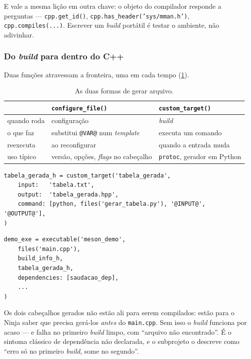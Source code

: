 E vale a mesma lição em outra chave: o objeto do compilador responde a
perguntas --- \texttt{cpp.get\_id()}, \texttt{cpp.has\_header('sys/mman.h')},
\texttt{cpp.compiles(...)}. Escrever um \emph{build} portátil é testar o
ambiente, não adivinhar.

\subsubsection{Do \emph{build} para dentro do C++}

Duas funções atravessam a fronteira, uma em cada tempo
(\cref{tab:configure-custom}).

\begin{table}[htbp]
\centering
\caption{As duas formas de gerar arquivo.}
\label{tab:configure-custom}
\footnotesize
\begin{tabular}{@{}lll@{}}
\toprule
 & \texttt{configure\_file()} & \texttt{custom\_target()} \\
\midrule
quando roda   & configuração         & \emph{build} \\
o que faz     & substitui \texttt{@VAR@} num \emph{template} & executa um comando \\
reexecuta     & ao reconfigurar      & quando a entrada muda \\
uso típico    & versão, opções, \emph{flags} no cabeçalho & \texttt{protoc}, gerador em Python \\
\bottomrule
\end{tabular}
\end{table}

\begin{lstlisting}[style=bt, language=Meson,
    caption={Um gerador rodando no \emph{build}, em \texttt{src/meson/meson.build}.}]
tabela_gerada_h = custom_target('tabela_gerada',
    input:   'tabela.txt',
    output:  'tabela_gerada.hpp',
    command: [python, files('gerar_tabela.py'), '@INPUT@', '@OUTPUT@'],
)
\end{lstlisting}

\begin{regra}
\begin{lstlisting}[style=bt, language=Meson, frame=none,
                   xleftmargin=0pt, xrightmargin=0pt]
demo_exe = executable('meson_demo',
    files('main.cpp'),
    build_info_h,
    tabela_gerada_h,
    dependencies: [saudacao_dep],
    ...
)
\end{lstlisting}
Os dois cabeçalhos gerados não estão ali para serem compilados: estão para o
Ninja saber que precisa gerá-los \emph{antes} do \texttt{main.cpp}. Sem isso o
\emph{build} funciona por acaso --- e falha no primeiro \emph{build} limpo, com
``arquivo não encontrado''. É o sintoma clássico de dependência não declarada, e
o subprojeto o descreve como ``erro só no primeiro \emph{build}, some no
segundo''.
\end{regra}


